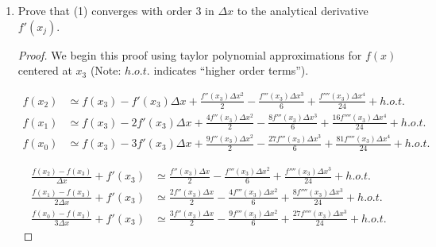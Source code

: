 \documentclass{article}
\begin{document}
\begin{enumerate}[label=\alph*)]
\begin{proof}
        \begin{align}
            f'(x_3) &\simeq f(x_0) l_0'(x_3) + f(x_1) l_1'(x_3) + f(x_2) l_2'(x_3) + f(x_3)l_3'(x_3) \\
                          &\simeq -\frac{f(x_0)}{3\Delta x} + \frac{3f(x_1)}{2\Delta x} - \frac{3f(x_2)}{\Delta x} + \frac{11f(x_3)}{6\Delta x} \\
                          &\simeq \frac{11f(x_3) - 18f(x_2)+ 9f(x_1)-2f(x_0)}{6\Delta x}
\
        \end{align}
    \end{proof}

    \item Prove that (1) converges with order 3 in $\Delta x$ to the analytical derivative $f'(x_j)$.

    \begin{proof}
    
        We begin this proof using taylor polynomial approximations for $f(x)$ centered at $x_3$ (Note: $h.o.t.$ indicates ``higher order terms'').
        
        \begin{align}
            f(x_2) &\simeq f(x_3) - f'(x_3)\Delta x + \frac{f''(x_3)\Delta x^2}{2} - \frac{f'''(x_3) \Delta x^3}{6} + \frac{f''''(x_3)\Delta x^4}{24} + h.o.t. \\
            f(x_1) &\simeq f(x_3) - 2f'(x_3)\Delta x + \frac{4f''(x_3)\Delta x^2}{2} - \frac{8f'''(x_3) \Delta x^3}{6} + \frac{16f''''(x_3)\Delta x^4}{24} + h.o.t. \\
            f(x_0) &\simeq f(x_3) - 3f'(x_3)\Delta x + \frac{9f''(x_3)\Delta x^2}{2} - \frac{27f'''(x_3) \Delta x^3}{6} + \frac{81f''''(x_3)\Delta x^4}{24} + h.o.t. 
        \end{align}

        \begin{align}
            \frac{f(x_2) - f(x_3)}{\Delta x} + f'(x_3) &\simeq \frac{f''(x_3)\Delta x}{2} - \frac{f'''(x_3) \Delta x^2}{6} + \frac{f''''(x_3)\Delta x^3}{24} + h.o.t. \\
            \frac{f(x_1) - f(x_3)}{2\Delta x} + f'(x_3) &\simeq \frac{2f''(x_3)\Delta x}{2} - \frac{4f'''(x_3) \Delta x^2}{6} + \frac{8f''''(x_3)\Delta x^3}{24} + h.o.t. \\
            \frac{f(x_0) - f(x_3)}{3\Delta x} + f'(x_3) &\simeq \frac{3f''(x_3)\Delta x}{2} - \frac{9f'''(x_3) \Delta x^2}{6} + \frac{27f''''(x_3)\Delta x^3}{24} + h.o.t. 
        \end{align}


\end{proof}
\end{enumerate}
\end{document}
